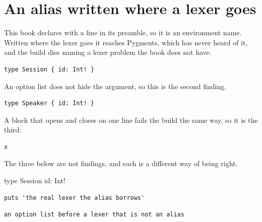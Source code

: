 \section{An alias written where a lexer goes}
\label{sec:ch01-minted-alias}

This book declares  with a  line in its
preamble, so it is an environment name. Written where the lexer goes it
reaches Pygments, which has never heard of it, and the build dies naming a
lexer problem the book does not have.

\begin{verbatim}
type Session { id: Int! }
\end{verbatim}

An option list does not hide the argument, so this is the second finding.

\begin{verbatim}
type Speaker { id: Int! }
\end{verbatim}

A block that opens and closes on one line fails the build the same way, so it
is the third: \begin{verbatim}x\end{verbatim}

The three below are not findings, and each is a different way of being right.

\begin{fixturesdl}
type Session { id: Int! }
\end{fixturesdl}

\begin{verbatim}
puts 'the real lexer the alias borrows'
\end{verbatim}

\begin{verbatim}
an option list before a lexer that is not an alias
\end{verbatim}
